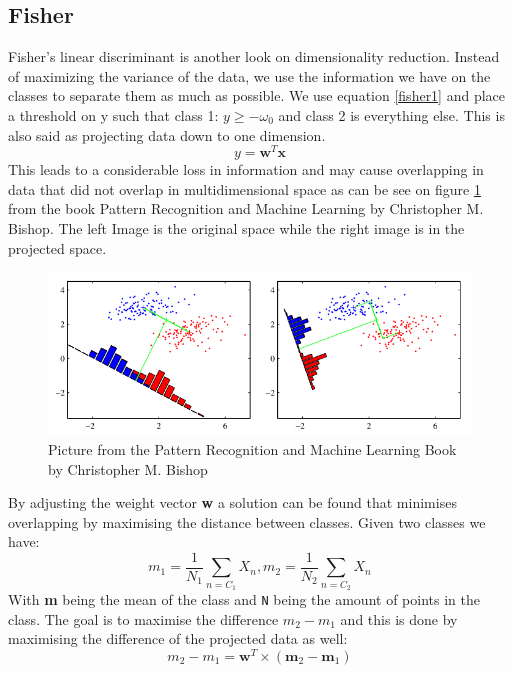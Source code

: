 \subsection{Fisher}
Fisher's linear discriminant is another look on dimensionality reduction. Instead of maximizing the variance of the data, we use the information we have on the classes to separate them as much as possible. We use equation \ref{fisher1} and place a threshold on y such that class 1: $y\geqslant -\omega_0$ and class 2 is everything else. This is also said as projecting data down to one dimension.
\begin{equation}
\label{fisher1}
y = \textbf{w}^T\textbf{x}
\end{equation}
This leads to a considerable loss in information and may cause overlapping in data that did not overlap in multidimensional space as can be see on figure \ref{fig:fisherfrombook} from the book Pattern Recognition and Machine Learning by Christopher M. Bishop\cite{bishop2006pattern}. The left Image is  the original space while the right image is in the projected space.\\
\begin{figure}[H]
\centering
\includegraphics[width=1\textwidth]{billeder/fisherfrombook}
\caption{Picture from the Pattern Recognition and Machine Learning Book by Christopher M. Bishop}
\label{fig:fisherfrombook}
\end{figure}
By adjusting the weight vector \textbf{w} a solution can be found that minimises overlapping by maximising the distance between classes. Given two classes we have:
\begin{equation}
m_1 = \frac{1}{N_1} \sum_{n=C_1} X_n,       m_2 = \frac{1}{N_2} \sum_{n=C_2} X_n
\end{equation}
With \textbf{m} being the mean of the class and \texttt{N} being the amount of points in the class. The goal is to maximise the difference $m_2 - m_1$ and this is done by maximising the difference of the projected data as well:
\begin{equation}
m_2 - m_1 = \textbf{w}^{T} \times ( \textbf{m}_2 - \textbf{m}_1 )
\end{equation}
